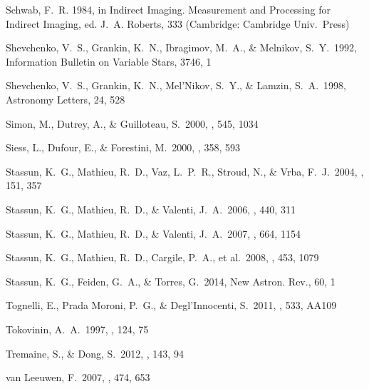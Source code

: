 \documentclass{aastex6}
\begin{document}
\begin{thebibliography}{}
{Schwab}, F.~R. 1984, in {Indirect Imaging. Measurement and Processing for
  Indirect Imaging}, ed. J.~A. {Roberts}, 333 (Cambridge: Cambridge Univ.~Press)

 Shevchenko, V.~S.,
Grankin, K.~N., Ibragimov, M.~A.,
\& Melnikov, S.~Y.\ 1992, Information Bulletin on Variable Stars, 3746, 1

 Shevchenko, V.~S.,
Grankin, K.~N., Mel'Nikov, S.~Y.,
\& Lamzin, S.~A.\ 1998, Astronomy Letters, 24, 528


 Simon, M., Dutrey, A., \& Guilloteau, S.\ 2000, \apj, 545, 1034

 Siess, L., Dufour, E., \& Forestini, M.\ 2000, \aap, 358, 593

 Stassun, K.~G.,
Mathieu, R.~D., Vaz, L.~P.~R., Stroud, N.,
\& Vrba, F.~J.\ 2004, \apjs, 151, 357

 Stassun, K.~G.,
Mathieu, R.~D., \& Valenti, J.~A.\ 2006, \nat, 440, 311

 Stassun, K.~G.,
Mathieu, R.~D., \& Valenti, J.~A.\ 2007, \apj, 664, 1154

 Stassun, K.~G.,
Mathieu, R.~D., Cargile, P.~A., et al.\ 2008, \nat, 453, 1079

Stassun, K.~G., Feiden, G.~A., \& Torres, G.\ 2014, New Astron. Rev., 60, 1

 Tognelli, E., Prada Moroni, P.~G., \& Degl'Innocenti, S.\ 2011, \aap, 533, AA109

 Tokovinin, A.~A.\ 1997, \aaps, 124, 75


 Tremaine, S., \& Dong, S.\ 2012, \aj, 143, 94

 van Leeuwen, F.\ 2007, \aap, 474, 653


\end{thebibliography}
\end{document}
